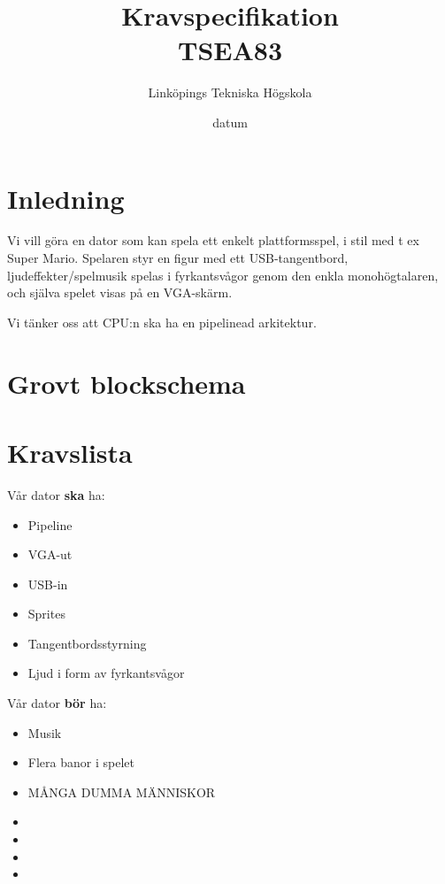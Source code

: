 \documentclass[a4paper,titlepage]{article}
\title{
\textbf{Kravspecifikation} \\
\large TSEA83}
\date{datum}
\author{Linköpings Tekniska Högskola}
\begin{document}
	\maketitle
	\newpage
\section{Inledning}
Vi vill göra en dator som kan spela ett enkelt plattformsspel, i stil med t ex
Super Mario. Spelaren styr en figur med ett USB-tangentbord,
ljudeffekter/spelmusik spelas i fyrkantsvågor genom den enkla monohögtalaren,
och själva spelet visas på en VGA-skärm.

Vi tänker oss att CPU:n ska ha en pipelinead arkitektur.
\section{Grovt blockschema}
\section{Kravslista}
Vår dator \textbf{ska} ha:
\begin{itemize}
	\item Pipeline
	\item VGA-ut
	\item USB-in
	\item Sprites
	\item Tangentbordsstyrning
	\item Ljud i form av fyrkantsvågor
\end{itemize}
Vår dator \textbf{bör} ha:
\begin{itemize}
	\item Musik
	\item Flera banor i spelet
	\item MÅNGA DUMMA MÄNNISKOR
	\item 
	\item 
	\item
	\item
\end{itemize}
\end{document}
